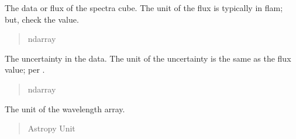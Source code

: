 \documentclass[letterpaper,11pt,english]{sphinxmanual}
\begin{document}
\begin{savenotes}
\begin{fulllineitems}
\begin{savenotes}\begin{fulllineitems}
\label{\detokenize{code/lezargus.container.parent:lezargus.container.parent.LezargusContainerArithmetic.data}}
\pysigstartsignatures
{}
\pysigstopsignatures
\sphinxAtStartPar
The data or flux of the spectra cube. The unit of the flux is typically
in flam; but, check the  value.
\begin{quote}\begin{description}
\sphinxAtStartPar
ndarray

\end{description}\end{quote}

\end{fulllineitems}\end{savenotes}


\begin{savenotes}\begin{fulllineitems}
\label{\detokenize{code/lezargus.container.parent:lezargus.container.parent.LezargusContainerArithmetic.uncertainty}}
\pysigstartsignatures
{}
\pysigstopsignatures
\sphinxAtStartPar
The uncertainty in the data. The unit of the uncertainty
is the same as the flux value; per .
\begin{quote}\begin{description}
\sphinxAtStartPar
ndarray

\end{description}\end{quote}

\end{fulllineitems}\end{savenotes}


\begin{savenotes}\begin{fulllineitems}
\label{\detokenize{code/lezargus.container.parent:lezargus.container.parent.LezargusContainerArithmetic.wavelength_unit}}
\pysigstartsignatures
{}
\pysigstopsignatures
\sphinxAtStartPar
The unit of the wavelength array.
\begin{quote}\begin{description}
\sphinxAtStartPar
Astropy Unit


\end{description}
\end{quote}
\end{fulllineitems}
\end{savenotes}
\end{fulllineitems}
\end{savenotes}
\end{document}
